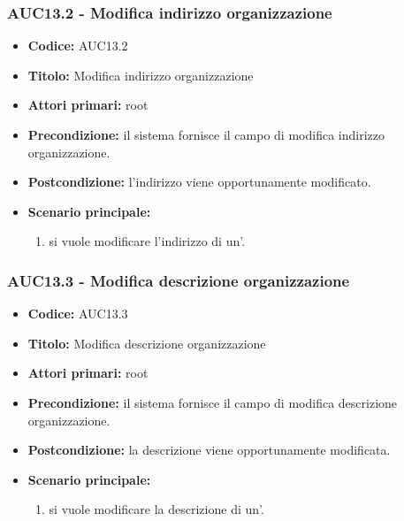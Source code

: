 \documentclass[casi-duso]{subfiles}
\begin{document}
\subsubsection{AUC13.2 - Modifica indirizzo organizzazione}
\label{subsub:AUC13.2}
\begin{itemize}
  \item \textbf{Codice:} AUC13.2
  \item \textbf{Titolo:} Modifica indirizzo organizzazione
  \item \textbf{Attori primari:} root
  \item \textbf{Precondizione:} il sistema fornisce il campo di modifica indirizzo organizzazione.
  \item \textbf{Postcondizione:} l'indirizzo viene opportunamente modificato.
  \item \textbf{Scenario principale:}
  \begin{enumerate}
    \item si vuole modificare l'indirizzo di un'.
  \end{enumerate}
\end{itemize}

\subsubsection{AUC13.3 - Modifica descrizione organizzazione}
\label{subsub:AUC13.3}
\begin{itemize}
  \item \textbf{Codice:} AUC13.3
  \item \textbf{Titolo:} Modifica descrizione organizzazione
  \item \textbf{Attori primari:} root
  \item \textbf{Precondizione:} il sistema fornisce il campo di modifica descrizione organizzazione.
  \item \textbf{Postcondizione:} la descrizione viene opportunamente modificata.
  \item \textbf{Scenario principale:}
  \begin{enumerate}
    \item si vuole modificare la descrizione di un'.
  \end{enumerate}
\end{itemize}
\end{document}
